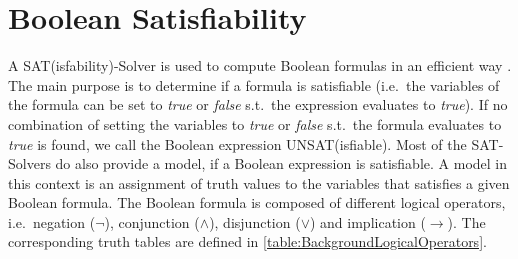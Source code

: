 \section{Boolean Satisfiability}
\label{sec:BooleanSatisfiability}

A SAT(isfability)-Solver is used to compute Boolean formulas in an efficient way \cite{Biere2009}. The main purpose is to determine if a formula is satisfiable (i.e.\ the variables of the formula can be set to \emph{true} or \emph{false} s.t.\ the expression evaluates to \emph{true}). If no combination of setting the variables to \emph{true} or \emph{false} s.t.\ the formula evaluates to \emph{true} is found, we call the Boolean expression UNSAT(isfiable). Most of the SAT-Solvers do also provide a model, if a Boolean expression is satisfiable. A model in this context is an assignment of truth values to the variables that satisfies a given Boolean formula. The Boolean formula is composed of different logical operators, i.e.\ negation ($\lnot$), conjunction ($\land$), disjunction ($\lor$) and implication ($\rightarrow$). The corresponding truth tables are defined in \cref{table:BackgroundLogicalOperators}.

